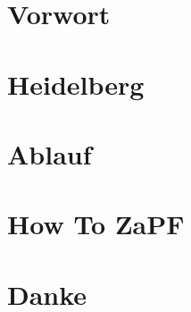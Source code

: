 \documentclass[ngerman,a5paper, 11pt]{scrbook}
\begin{document}
\chapter{Vorwort}


\setcounter{tocdepth}{1} %
\tableofcontents



\chapter{Heidelberg}








\chapter{Ablauf}




\chapter{How To ZaPF}





\chapter{Danke}




\end{document}
